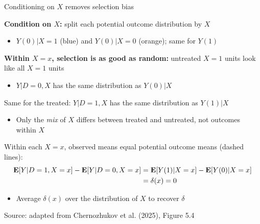 \documentclass[compress, 8pt]{beamer}
\begin{document}
\begin{frame}{Conditioning on $X$ removes selection bias}
\begin{overprint}
\textbf{Condition on $X$:} split each potential outcome distribution by $X$
\begin{itemize}
    \item $Y(0) \vert X = 1$ ({\color{MainBlue}blue}) and $Y(0) \vert X = 0$ ({\color{Orange}orange}); same for $Y(1)$
\end{itemize}
\textbf{Within $X = x$, selection is as good as random:} untreated $X = 1$ units look like all $X = 1$ units
\begin{itemize}
    \item[$\implies$] $Y \vert D = 0, X$ has the same distribution as $Y(0) \vert X$
\end{itemize}
Same for the treated: $Y \vert D = 1, X$ has the same distribution as $Y(1) \vert X$
\begin{itemize}
    \item Only the \emph{mix} of $X$ differs between treated and untreated, not outcomes within $X$
\end{itemize}
Within each $X = x$, observed means equal potential outcome means (dashed lines):
\begin{align*}
    \mathbf{E} [Y \vert D = 1, X = x] - \mathbf{E} [Y \vert D = 0, X = x]
    &= \mathbf{E} [Y(1) \vert X = x] - \mathbf{E} [Y(0) \vert X = x] \\
    &= \delta(x) = 0
\end{align*}
\begin{itemize}
    \item Average $\delta(x)$ over the distribution of $X$ to recover $\delta$
\end{itemize}
\end{overprint}

\vspace{1ex}
{\footnotesize Source: adapted from Chernozhukov et al. (2025), Figure 5.4}
\end{frame}
\end{document}
